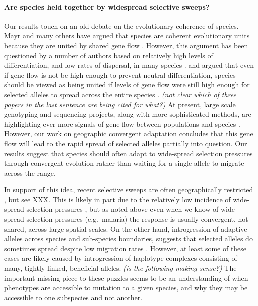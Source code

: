 \documentclass{article}
\newcommand{\plr}[1]{{\it\color{blue}(#1)}}
\begin{document}
\paragraph{Are species held together by widespread selective sweeps?}
Our results touch on an old debate on the evolutionary coherence of species. 
Mayr and many others have argued that species are coherent
evolutionary units because they are united by shared gene flow \citep[pages 521--522 ][]{Mayr:SpeciesEvol}. 
However, this argument has been questioned by a number of authors 
based on relatively high levels of differentiation, and low rates of dispersal, in many species \citep{EhrlichRaven:69,Levin:79}.
\citet{Rieseberg2001} and \citet{MorjanRieseberg:04} argued that 
even if gene flow is not be high enough to prevent neutral differentiation, 
species should be viewed as being united 
if levels of gene flow were still high enough for selected alleles to spread across the entire species \citep{Ellstrand2014s}.
\plr{not clear which of three papers in the last sentence are being cited for what?}
At present, large scale genotyping and sequencing projects, 
along with more sophisticated methods, 
are highlighting ever more signals of gene flow between populations and species \citep{}.
However, our work on geographic convergent adaptation
\citep[see also][]{ralph2010parallel,RalphCoop:14} 
concludes that this gene flow will lead to the rapid spread of
selected alleles partially into question. 
Our results suggest that species should often adapt to
wide-spread selection pressures through convergent evolution rather
than waiting for a single allele to migrate across the range.
 
In support of this idea, recent selective sweeps are often
geographically restricted \citep{}, but see XXX. 
This is likely in part due to the relatively low incidence of wide-spread selection pressures \citep{},
but as noted above even when we know of wide-spread selection
pressures (e.g.\ malaria) the response is usually convergent, not shared, across large spatial scales. 
On the other hand, 
introgression of adaptive alleles across species and sub-species boundaries, 
suggests that selected alleles do sometimes spread despite low migration rates \citep{hedrick2013adaptive}.
However, at least some of these cases 
are likely caused by introgression of haplotype complexes
consisting of many, tightly linked, beneficial alleles.  
\plr{is the following making sense?}
The important missing piece to these puzzles seems to be an understanding
of when phenotypes are accessible to mutation to a given species,
and why they may be accessible to one subspecies and not another.
\end{document}
